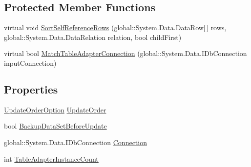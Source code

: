 \subsection*{Protected Member Functions}
\begin{DoxyCompactItemize}
\item 
virtual void \hyperlink{classprj_progra_i_i_i_1_1rpt___free_spaces_on_event_table_adapters_1_1_table_adapter_manager_ade6a6bafa046f9fe7655a4c7eb5846e1}{Sort\+Self\+Reference\+Rows} (global\+::\+System.\+Data.\+Data\+Row\mbox{[}$\,$\mbox{]} rows, global\+::\+System.\+Data.\+Data\+Relation relation, bool child\+First)
\item 
virtual bool \hyperlink{classprj_progra_i_i_i_1_1rpt___free_spaces_on_event_table_adapters_1_1_table_adapter_manager_a8fef0fa6cf53820e2c852521ad0a0c89}{Match\+Table\+Adapter\+Connection} (global\+::\+System.\+Data.\+I\+Db\+Connection input\+Connection)
\end{DoxyCompactItemize}
\subsection*{Properties}
\begin{DoxyCompactItemize}
\item 
\hyperlink{classprj_progra_i_i_i_1_1rpt___free_spaces_on_event_table_adapters_1_1_table_adapter_manager_a9cfd63ba078114fdb1994cfe5f0d2eeb}{Update\+Order\+Option} \hyperlink{classprj_progra_i_i_i_1_1rpt___free_spaces_on_event_table_adapters_1_1_table_adapter_manager_a26e14231d6c7fe79ffad82451e723224}{Update\+Order}
\item 
bool \hyperlink{classprj_progra_i_i_i_1_1rpt___free_spaces_on_event_table_adapters_1_1_table_adapter_manager_a33bb69045bb1606f9aeb280699bf6f85}{Backup\+Data\+Set\+Before\+Update}
\item 
global\+::\+System.\+Data.\+I\+Db\+Connection \hyperlink{classprj_progra_i_i_i_1_1rpt___free_spaces_on_event_table_adapters_1_1_table_adapter_manager_a719b880733d9ce3d2e2f309712eb4ddd}{Connection}
\item 
int \hyperlink{classprj_progra_i_i_i_1_1rpt___free_spaces_on_event_table_adapters_1_1_table_adapter_manager_ad1d13a9fc55336985abff877dd354237}{Table\+Adapter\+Instance\+Count}
\end{DoxyCompactItemize}


